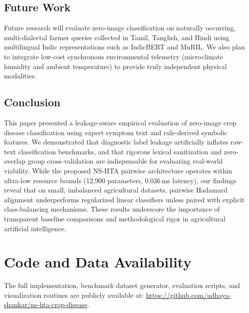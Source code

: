 \documentclass[conference]{IEEEtran}
\begin{document}
\subsection{Future Work}
Future research will evaluate zero-image classification on naturally occurring, multi-dialectal farmer queries collected in Tamil, Tanglish, and Hindi using multilingual Indic representations such as IndicBERT and MuRIL. We also plan to integrate low-cost synchronous environmental telemetry (microclimate humidity and ambient temperature) to provide truly independent physical modalities.

\subsection{Conclusion}
This paper presented a leakage-aware empirical evaluation of zero-image crop disease classification using expert symptom text and rule-derived symbolic features. We demonstrated that diagnostic label leakage artificially inflates raw-text classification benchmarks, and that rigorous lexical sanitization and zero-overlap group cross-validation are indispensable for evaluating real-world viability. While the proposed NS-HTA pairwise architecture operates within ultra-low resource bounds (12,900 parameters, 0.036\,ms latency), our findings reveal that on small, imbalanced agricultural datasets, pairwise Hadamard alignment underperforms regularized linear classifiers unless paired with explicit class-balancing mechanisms. These results underscore the importance of transparent baseline comparisons and methodological rigor in agricultural artificial intelligence.

\section*{Code and Data Availability}
The full implementation, benchmark dataset generator, evaluation scripts, and visualization routines are publicly available at: \url{https://github.com/udhaya-shankar/ns-hta-crop-disease}.
\end{document}
